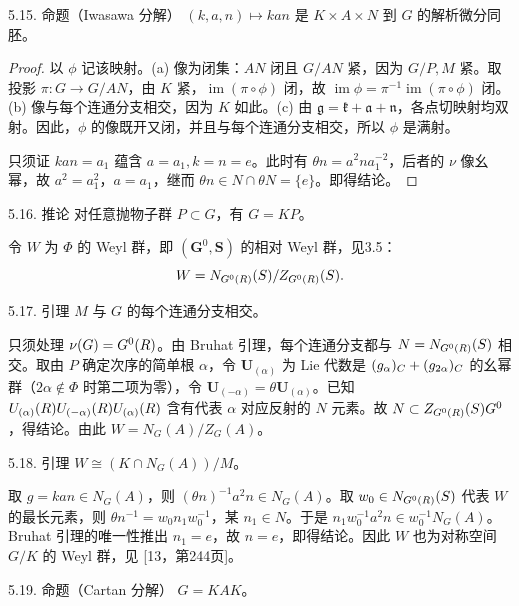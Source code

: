 \begin{originaltheorem}{5.15. 命题（Iwasawa 分解）}
$(k,a,n)\mapsto kan$ 是 $K\times A\times N$ 到 $G$ 的解析微分同胚。
\end{originaltheorem}
\begin{proof}
以 $\phi$ 记该映射。(a) 像为闭集：$AN$ 闭且 $G/AN$ 紧，因为 $G/P,M$ 紧。取投影 $\pi:G\to G/AN$，由 $K$ 紧，$\operatorname{im}(\pi\circ\phi)$ 闭，故 $\operatorname{im}\phi=\pi^{-1}\operatorname{im}(\pi\circ\phi)$ 闭。(b) 像与每个连通分支相交，因为 $K$ 如此。(c) 由 $\mathfrak g=\mathfrak k+\mathfrak a+\mathfrak n$，各点切映射均双射。因此，$\phi$ 的像既开又闭，并且与每个连通分支相交，所以 $\phi$ 是满射。

只须证 $kan=a_1$ 蕴含 $a=a_1,k=n=e$。此时有 $\theta n=a^2na_1^{-2}$，后者的 $\nu$ 像幺幂，故 $a^2=a_1^2$，$a=a_1$，继而 $\theta n\in N\cap\theta N=\{e\}$。即得结论。
\end{proof}
\begin{originaltheorem}{5.16. 推论}
对任意抛物子群 $P\subset G$，有 $G=KP$。
\end{originaltheorem}
令 $W$ 为 $\Phi$ 的 Weyl 群，即 $(\mathbf G^0,\mathbf S)$ 的相对 Weyl 群，见3.5：
\[
 W=N_{G^0(R)}(S)/Z_{G^0(R)}(S).
\]
\begin{originaltheorem}{5.17. 引理}
$M$ 与 $G$ 的每个连通分支相交。
\end{originaltheorem}
只须处理 $\nu(G)=G^0(R)$。由 Bruhat 引理，每个连通分支都与 $N=N_{G^0(R)}(S)$ 相交。取由 $P$ 确定次序的简单根 $\alpha$，令 $\mathbf U_{(\alpha)}$ 为 Lie 代数是 $(g_\alpha)_{C}+(g_{2\alpha})_{C}$ 的幺幂群（$2\alpha\notin\Phi$ 时第二项为零），令 $\mathbf U_{(-\alpha)}=\theta\mathbf U_{(\alpha)}$。已知
$U_{(\alpha)}(R)U_{(-\alpha)}(R)U_{(\alpha)}(R)$ 含有代表 $\alpha$ 对应反射的 $N$ 元素。故 $N\subset Z_{G^0(R)}(S)G^0$，得结论。由此 $W=N_G(A)/Z_G(A)$。
\begin{originaltheorem}{5.18. 引理}
$W\cong(K\cap N_G(A))/M$。
\end{originaltheorem}
取 $g=kan\in N_G(A)$，则 $(\theta n)^{-1}a^2n\in N_G(A)$。取 $w_0\in N_{G^0(R)}(S)$ 代表 $W$ 的最长元素，则 $\theta n^{-1}=w_0n_1w_0^{-1}$，某 $n_1\in N$。于是 $n_1w_0^{-1}a^2n\in w_0^{-1}N_G(A)$。Bruhat 引理的唯一性推出 $n_1=e$，故 $n=e$，即得结论。因此 $W$ 也为对称空间 $G/K$ 的 Weyl 群，见 [13，第244页]。
\begin{originaltheorem}{5.19. 命题（Cartan 分解）}
$G=KAK$。
\end{originaltheorem}
